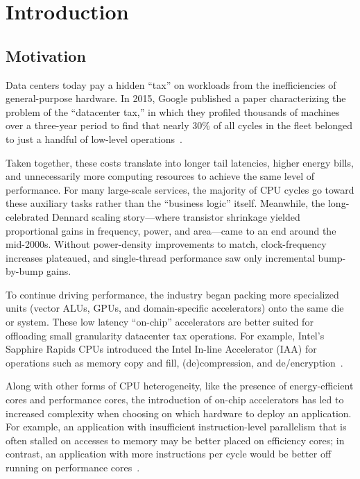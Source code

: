 \section{Introduction}

\subsection{Motivation}

Data centers today pay a hidden ``tax'' on workloads from the inefficiencies of general-purpose hardware.
In 2015, Google published a paper characterizing the problem of the ``datacenter tax,'' in which they profiled thousands of machines over a three-year period to find that nearly 30\% of all cycles in the fleet belonged to just a handful of low-level operations~\cite{kanev2015profiling}.


Taken together, these costs translate into longer tail latencies, higher energy bills, and unnecessarily more computing resources to achieve the same level of performance.
For many large-scale services, the majority of CPU cycles go toward these auxiliary tasks rather than the ``business logic'' itself.
Meanwhile, the long-celebrated Dennard scaling story---where transistor shrinkage yielded proportional gains in frequency, power, and area---came to an end around the mid-2000s. Without power-density improvements to match, clock-frequency increases plateaued, and single-thread performance saw only incremental bump-by-bump gains.

To continue driving performance, the industry began packing more specialized units (vector ALUs, GPUs, and domain-specific accelerators) onto the same die or system.
These low latency ``on-chip'' accelerators are better suited for offloading small granularity datacenter tax operations.
For example, Intel's Sapphire Rapids CPUs introduced the Intel In-line Accelerator (IAA) for operations such as memory copy and fill, (de)compression, and de/encryption~\cite{yuan2024intel}.

Along with other forms of CPU heterogeneity, like the presence of energy-efficient cores and performance cores, the introduction of on-chip accelerators has led to increased complexity when choosing on which hardware to deploy an application.
For example, an application with insufficient instruction-level parallelism that is often stalled on accesses to memory may be better placed on efficiency cores; in contrast, an application with more instructions per cycle would be better off running on performance cores~\cite{kanev2015profiling}.

